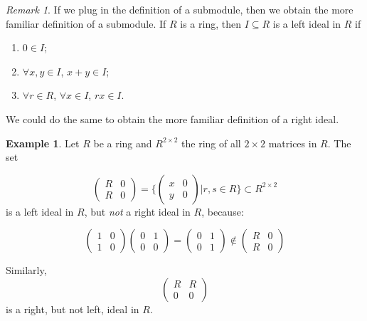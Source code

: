 \documentclass[12pt, a4paper, titlepage]{report}
\theoremstyle{plain} %
\theoremstyle{definition}
\newtheorem{exmp}{Example}[section]
\theoremstyle{remark}
\newtheorem*{rem}{Remark}
\begin{document}
\begin{rem}

  If we plug in the definition of a submodule, then we obtain the more familiar definition of a submodule. If $R$ is a
  ring, then $I \subseteq R$ is a left ideal in $R$ if

  \begin{enumerate}
  \item $0 \in I$;
  \item $\forall x, y \in I$, $x + y \in I$;
  \item $\forall r \in R$, $\forall x \in I$, $rx \in I$.
  \end{enumerate}

  We could do the same to obtain the more familiar definition of a right ideal.
  
\end{rem}

\begin{exmp}
  Let $R$ be a ring and $R^{2 \times 2}$ the ring of all $2 \times 2$ matrices in $R$. The set

  \[
    \begin{pmatrix}
      R & 0\\
      R & 0
    \end{pmatrix} =
    \Big\{
    \begin{pmatrix}
      x & 0\\
      y & 0
    \end{pmatrix}
    \Big|
    r, s \in R
    \big\} \subset R^{2 \times 2}
  \]
  is a left ideal in $R$, but \textit{not} a right ideal in $R$, because:

  \[
    \begin{pmatrix}
      1 & 0\\
      1 & 0
    \end{pmatrix}
    \begin{pmatrix}
      0 & 1\\
      0 & 0
    \end{pmatrix} =
    \begin{pmatrix}
      0 & 1\\
      0 & 1
    \end{pmatrix} \notin
    \begin{pmatrix}
      R & 0\\
      R & 0
    \end{pmatrix}
  \]

  Similarly,
  \[
    \begin{pmatrix}
      R & R\\
      0 & 0
    \end{pmatrix}
  \]
  is a right, but not left, ideal in $R$.
  
\end{exmp}
\end{document}

